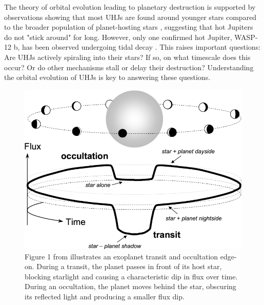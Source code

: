 \documentclass[oneside,12pt]{amsart}
\numberwithin{page}{section}
\begin{document}
The theory of orbital evolution leading to planetary destruction is supported by observations showing that most UHJs are found around younger stars compared to the broader population of planet-hosting stars \citep{hamer2019hot}, suggesting that hot Jupiters do not "stick around" for long. However, only one confirmed hot Jupiter, WASP-12 b, has been observed undergoing tidal decay \citep{yee2019orbit}. This raises important questions: Are UHJs actively spiraling into their stars? If so, on what timescale does this occur? Or do other mechanisms stall or delay their destruction? Understanding the orbital evolution of UHJs is key to answering these questions.

\begin{figure}[htbp]
    \centering
    \includegraphics[width=0.7\linewidth]{figs/winn_fig1.png}
    \caption{Figure 1 from \citet{winn2010transits} illustrates an exoplanet transit and occultation edge-on. During a transit, the planet passes in front of its host star, blocking starlight and causing a characteristic dip in flux over time. During an occultation, the planet moves behind the star, obscuring its reflected light and producing a smaller flux dip.}
    \label{fig:winnfig1}
\end{figure}
\end{document}
